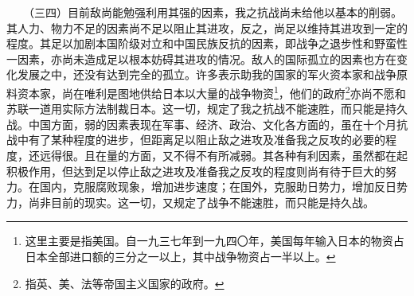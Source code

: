\documentclass[cn,11pt,chinese]{elegantbook}
\begin{document}
　　（三四）目前敌尚能勉强利用其强的因素，我之抗战尚未给他以基本的削弱。其人力、物力不足的因素尚不足以阻止其进攻，反之，尚足以维持其进攻到一定的程度。其足以加剧本国阶级对立和中国民族反抗的因素，即战争之退步性和野蛮性一因素，亦尚未造成足以根本妨碍其进攻的情况。敌人的国际孤立的因素也方在变化发展之中，还没有达到完全的孤立。许多表示助我的国家的军火资本家和战争原料资本家，尚在唯利是图地供给日本以大量的战争物资\footnote[15]{ 这里主要是指美国。自一九三七年到一九四〇年，美国每年输入日本的物资占日本全部进口额的三分之一以上，其中战争物资占一半以上。}，他们的政府\footnote[16]{ 指英、美、法等帝国主义国家的政府。}亦尚不愿和苏联一道用实际方法制裁日本。这一切，规定了我之抗战不能速胜，而只能是持久战。中国方面，弱的因素表现在军事、经济、政治、文化各方面的，虽在十个月抗战中有了某种程度的进步，但距离足以阻止敌之进攻及准备我之反攻的必要的程度，还远得很。且在量的方面，又不得不有所减弱。其各种有利因素，虽然都在起积极作用，但达到足以停止敌之进攻及准备我之反攻的程度则尚有待于巨大的努力。在国内，克服腐败现象，增加进步速度；在国外，克服助日势力，增加反日势力，尚非目前的现实。这一切，又规定了战争不能速胜，而只能是持久战。\\
\end{document}
